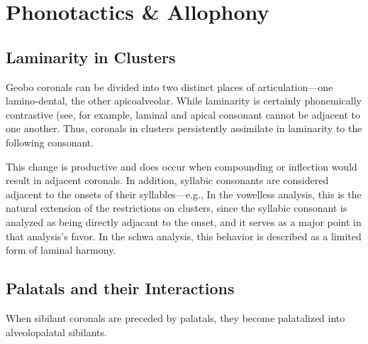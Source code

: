 \documentclass[a4paper,11pt,oneside,openany]{memoir}
\begin{document}
\section{Phonotactics \& Allophony}\label{sec:allophony}

\subsection{Laminarity in Clusters}

Geobo\engma{} coronals can be divided into two distinct places of articulation---one lamino-dental, the other apicoalveolar. While laminarity is certainly phonemically contrastive (see, for example, 
 laminal and apical consonant cannot be adjacent to one another. Thus, coronals in clusters persistently assimilate in laminarity to the following consonant. 

This change is productive and does occur when compounding or inflection would result in adjacent coronals. In addition, syllabic consonants are considered adjacent to the onsets of their syllables---e.g., 
In the vowelless analysis, this is the natural extension of the restrictions on clusters, since the syllabic consonant is analyzed as being directly adjacant to the onset, and it serves as a major point in that analysis's favor. In the schwa analysis, this behavior is described as a limited form of laminal harmony. 

\setlength{\tabcolsep}{1pt}
\begin{center}
\end{center}

\subsection{Palatals and their Interactions}

When sibilant coronals are preceded by palatals, they become palatalized into alveolopalatal sibilants. 

\begin{center}
\end{center}
\end{document}
